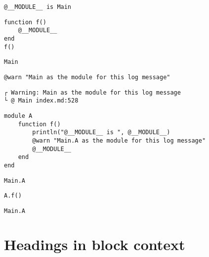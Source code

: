\begin{lstlisting}[]
@__MODULE__ is Main
\end{lstlisting}




\begin{lstlisting}[]
function f()
    @__MODULE__
end
f()
\end{lstlisting}


\begin{lstlisting}[]
Main
\end{lstlisting}




\begin{lstlisting}[]
@warn "Main as the module for this log message"
\end{lstlisting}


\begin{lstlisting}[]
┌ Warning: Main as the module for this log message
└ @ Main index.md:528
\end{lstlisting}




\begin{lstlisting}[]
module A
    function f()
        println("@__MODULE__ is ", @__MODULE__)
        @warn "Main.A as the module for this log message"
        @__MODULE__
    end
end
\end{lstlisting}


\begin{lstlisting}[]
Main.A
\end{lstlisting}




\begin{lstlisting}[]
A.f()
\end{lstlisting}


\begin{lstlisting}[]
Main.A
\end{lstlisting}



\section{Headings in block context}



\label{10276939801399720769}{}


